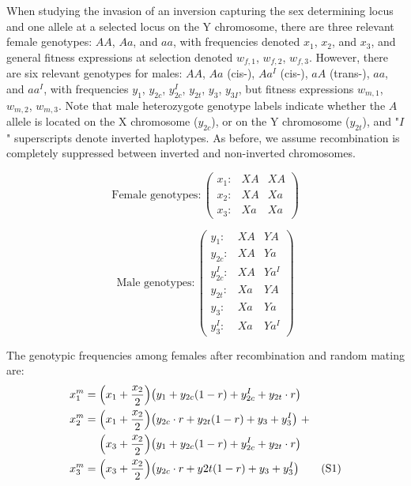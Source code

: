\documentclass{article}
\newcommand\numberthis{\addtocounter{equation}{1}\tag{\theequation}}
\begin{document}
\begin{appendices}
When studying the invasion of an inversion capturing the sex determining locus and one allele at a selected locus on the Y chromosome, there are three relevant female genotypes: $AA$, $Aa$, and $aa$, with frequencies denoted $x_1$, $x_2$, and $x_3$, and general fitness expressions at selection denoted $w_{f,1}$, $w_{f,2}$, $w_{f,3}$. However, there are six relevant genotypes for males: $AA$, $Aa$ (cis-), $Aa^I$ (cis-), $aA$ (trans-), $aa$, and $aa^I$, with frequencies $y_{1}$, $y_{2c}$, $y^I_{2c}$, $y_{2t}$, $y_{3}$, $y_{3I}$, but fitness expressions $w_{m,1}$, $w_{m,2}$, $w_{m,3}$. Note that male heterozygote genotype labels indicate whether the $A$ allele is located on the X chromosome ($y_{2c}$), or on the Y chromosome ($y_{2t}$), and "$I$" superscripts denote inverted haplotypes. As before, we assume recombination is completely suppressed between inverted and non-inverted chromosomes.

\begin{equation*}
	\text{Female genotypes}:\left( \begin{array}{cc|c}
		x_1: & XA & XA \\
		x_2: & XA & Xa \\
		x_3: & Xa & Xa 
	\end{array} \right)
\end{equation*}

\begin{equation*}
	\text{Male genotypes}:\left( \begin{array}{cc|c}
		y_1:     & XA & YA \\
		y_{2c}:   & XA & Ya \\
		y^I_{2c}: & XA & Ya^I \\
		y_{2t}:   & Xa & YA \\
		y_{3}:    & Xa & Ya \\
		y^I_{3}:  & Xa & Ya^I 
	\end{array} \right)
\end{equation*}

\noindent The genotypic frequencies among females after recombination and random mating are:
\begin{align*}
	x^m_{1} &= \Big( x_1 + \frac{x_2}{2} \Big) \big(y_1 + y_{2c}(1 - r) + y^I_{2c} + y_{2t} \cdot r \big) \\
	x^m_{2} &= \Big( x_1 + \frac{x_2}{2} \Big) \big( y_{2c} \cdot r + y_{2t}(1 - r) + y_3 + y^I_3 \big)~+ \\
	&~~~~\Big( x_3 + \frac{x_2}{2} \Big) \big( y_{1} + y_{2c}(1 - r) + y^I_{2c} + y_{2t} \cdot r \big)      \\
	x^m_{3} &= \Big( x_3 + \frac{x_2}{2} \Big) \big(y_{2c} \cdot r + y{2t}(1 - r) + y_{3} + y^I_3  \big) \numberthis
\end{align*}


\end{appendices}
\end{document}
